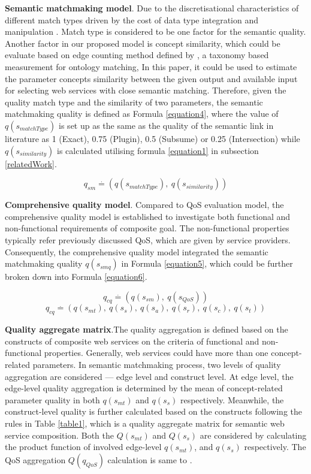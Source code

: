 \documentclass{llncs}
\begin{document}
\textbf{Semantic matchmaking model}. Due to the discretisational characteristics of different match types driven by the cost of  data type integration and manipulation \cite{lecue2009optimizing}. Match type is considered to be one factor for the semantic quality. Another factor in our proposed model is concept similarity, which could be evaluate based on edge counting method defined by \cite{shet2012new}, a taxonomy based measurement for ontology matching, In this paper, it could be used to estimate the parameter concepts similarity between the given output and available input for selecting web services with close semantic matching. Therefore, given the quality match type and the similarity of two parameters, the semantic matchmaking quality is defined as Formula \ref{equation4}, where the value of $q(s_ {matchType})$ is set up as the same as the quality of the semantic link in literature \cite{lecue2009optimizing} as 1 (Exact), 0.75 (Plugin), 0.5 (Subsume) or 0.25 (Intersection) while $q(s_ {similarity})$ is calculated utilising formula \ref{equation1} in subsection \ref{relatedWork}.

\begin{equation}
\label{equation4}
q_{sm} \stackrel{.}{=} (q(s_ {matchType}), \  q(s_ {similarity}))
\end{equation}

\textbf{Comprehensive quality model}. Compared to QoS evaluation model, the comprehensive quality model is established to investigate both functional and non-functional requirements of composite goal. The non-functional properties typically refer previously discussed QoS, which are given by service providers. Consequently, the comprehensive quality model integrated the semantic matchmaking quality $q(s_{smq})$ in Formula \ref{equation5}, which could be further broken down into Formula \ref{equation6}.

\begin{equation}
\label{equation5}
q_{cq} \stackrel{.}{=} (q(s_ {sm}), \  q(s_ {QoS}))
\end{equation}
\begin{equation}
\label{equation6}
q_{cq} \stackrel{.}{=} (q(s_ {mt}), \  q(s_ {s}), \  q(s_{a}),\  q(s_{r}),\  q(s_{c}),\  q(s_{t}))
\end{equation}

\textbf{Quality aggregate matrix}.The quality aggregation is defined based on the constructs of composite web services on the criteria of functional and non-functional properties. Generally, web services could have more than one concept-related parameters. In semantic matchmaking process, two levels of quality aggregation are considered --- edge level and construct level. At edge level, the edge-level quality aggregation is determined by the mean of concept-related parameter quality in both $q(s_{mt})$ and $q(s_{s})$ respectively. Meanwhile, the construct-level quality is further calculated based on the constructs following the rules in Table \ref{table1}, which is a quality aggregate matrix for semantic web service composition. Both the $Q(s_{mt})$ and $Q(s_{s})$ are considered by calculating the product function of involved edge-level $q(s_{mt})$, and $q(s_{s})$ respectively. The QoS aggregation $Q(q_{QoS})$ calculation is same to \cite{cardoso2004quality}.
\end{document}
